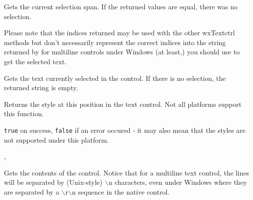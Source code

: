 
Gets the current selection span. If the returned values are equal, there was
no selection.

Please note that the indices returned may be used with the other wxTextctrl
methods but don't necessarily represent the correct indices into the string
returned by  for multiline controls
under Windows (at least,) you should use
 to get the selected
text.







\label{wxtextctrlgetstringselection}


Gets the text currently selected in the control. If there is no selection, the
returned string is empty.


\label{wxtextctrlgetstyle}


Returns the style at this position in the text control. Not all platforms
support this function.


{\tt true} on success, {\tt false} if an error occured - it may also mean that
the styles are not supported under this platform.


, 


\label{wxtextctrlgetvalue}


Gets the contents of the control. Notice that for a multiline text control,
the lines will be separated by (Unix-style) $\backslash$n characters, even
under Windows where they are separated by a $\backslash$r$\backslash$n
sequence in the native control.


